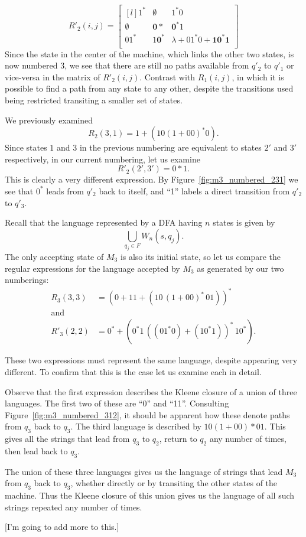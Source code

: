 \documentclass{bcthesis}
\begin{document}
\begin{example}
		\[
			R'_2 (i, j) = 
			\begin{bmatrix*}[l]
				1^*			& \emptyset		& 1^*0 										\\
				\emptyset 	& \bm{0*}		& \bm{0^*}1									\\
				01^* 		& 1\bm{0^*} 	& \lambda + 01^*0 + \bm{1 0^* 1} 			\\
			\end{bmatrix*}
		\]
		Since the state in the center of the machine, which links the other two states, is now numbered $3$, we see that there are still no paths available from $q'_2$ to $q'_1$ or vice-versa in the matrix of $R'_2(i, j)$.
		Contrast with $R_1 (i, j)$, in which it is possible to find a path from any state to any other, despite the transitions used being restricted transiting a smaller set of states.

		We previously examined
		\[
			R_2(3, 1) = 1 + (10 (1 + 00)^* 0).
		\]
		Since states $1$ and $3$ in the previous numbering are equivalent to states $2'$ and $3'$ respectively, in our current numbering, let us examine
		\[
			R'_2(2', 3') = 0*1.
		\]
		This is clearly a very different expression.
		By Figure~\ref{fig:m3_numbered_231} we see that $0^*$ leads from $q'_2$ back to itself, and ``1'' labels a direct transition from $q'_2$ to $q'_3$.

		Recall that the language represented by a DFA having $n$ states is given by 
		\[
			\bigcup_{q_j \in F} W_n(s, q_j).
		\]
		The only accepting state of $M_3$ is also its initial state, so let us compare the regular expressions for the language accepted by $M_3$ as generated by our two numberings:
		\begin{align*}
			R_3(3, 3) &= (0+11+(10 \, (1+00)^* \, 01))^* \\
			\text{and} \\
			R'_3(2, 2) &= 0^* + (0^*1 \, ((01^*0) + (10^*1))^* \, 10^*).
		\end{align*}

		These two expressions must represent the same language, despite appearing very different.
		To confirm that this is the case let us examine each in detail.

		Observe that the first expression describes the Kleene closure of a union of three languages.
		The first two of these are ``0'' and ``11''.
		Consulting Figure~\ref{fig:m3_numbered_312}, it should be apparent how these denote paths from $q_3$ back to $q_3$.
		The third language is described by $10 (1+00)* 01$.
		This gives all the strings that lead from $q_3$ to $q_2$, return to $q_2$ any number of times, then lead back to $q_3$.

		The union of these three languages gives us the language of strings that lead $M_3$ from $q_3$ back to $q_3$, whether directly or by transiting the other states of the machine. 
		Thus the Kleene closure of this union gives us the language of all such strings repeated any number of times.

		[I'm going to add more to this.]



	\end{example}
\end{document}
